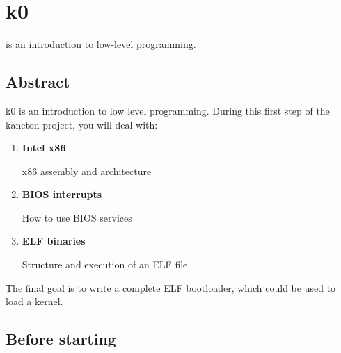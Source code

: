%
%
%
%
%
%

%
%

\chapter{k0}
\label{chapter:k0}

 is an introduction to low-level programming.

\newpage

%
%

\section{Abstract}

k0 is an introduction to low level programming. During this first step of
the kaneton project, you will deal with:

\begin{enumerate}
  \item
    {\bf Intel x86}

    x86 assembly and architecture
  \item
    {\bf BIOS interrupts}

    How to use BIOS services
  \item
    {\bf ELF binaries}

    Structure and execution of an ELF file
\end{enumerate}

The final goal is to write a complete ELF bootloader, which could be used to
load a kernel.

\clearpage

\section{Before starting}

